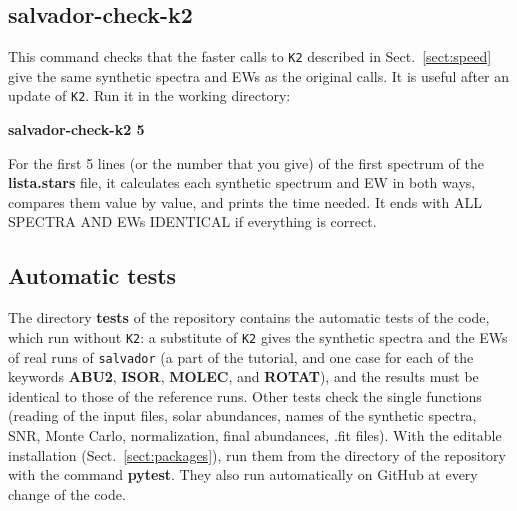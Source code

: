 \documentclass[modern]{aastex701}
\begin{document}
\subsection{salvador-check-k2}
This command checks that the faster calls to \texttt{K2} described in Sect.~\ref{sect:speed} give the same synthetic spectra and EWs as the original calls. It is useful after an update of \texttt{K2}. Run it in the working directory: 
\begin{center}
    {\bf salvador-check-k2 5}
\end{center}
For the first 5 lines (or the number that you give) of the first spectrum of the {\bf lista.stars} file, it calculates each synthetic spectrum and EW in both ways, compares them value by value, and prints the time needed. It ends with ALL SPECTRA AND EWs IDENTICAL if everything is correct.

\subsection{Automatic tests}
The directory {\bf tests} of the repository contains the automatic tests of the code, which run without \texttt{K2}: a substitute of \texttt{K2} gives the synthetic spectra and the EWs of real runs of \texttt{salvador} (a part of the tutorial, and one case for each of the keywords {\bf ABU2}, {\bf ISOR}, {\bf MOLEC}, and {\bf ROTAT}), and the results must be identical to those of the reference runs. Other tests check the single functions (reading of the input files, solar abundances, names of the synthetic spectra, SNR, Monte Carlo, normalization, final abundances, .fit files). With the editable installation (Sect.~\ref{sect:packages}), run them from the directory of the repository with the command {\bf pytest}. They also run automatically on GitHub at every change of the code.
\end{document}
